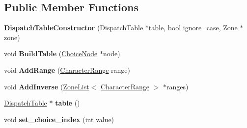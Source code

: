 \subsection*{Public Member Functions}
\begin{DoxyCompactItemize}
\item 
{\bfseries Dispatch\+Table\+Constructor} (\hyperlink{classv8_1_1internal_1_1_dispatch_table}{Dispatch\+Table} $\ast$table, bool ignore\+\_\+case, \hyperlink{classv8_1_1internal_1_1_zone}{Zone} $\ast$zone)\hypertarget{classv8_1_1internal_1_1_dispatch_table_constructor_a6b77a705962e90834c94f3bb955c13e0}{}\label{classv8_1_1internal_1_1_dispatch_table_constructor_a6b77a705962e90834c94f3bb955c13e0}

\item 
void {\bfseries Build\+Table} (\hyperlink{classv8_1_1internal_1_1_choice_node}{Choice\+Node} $\ast$node)\hypertarget{classv8_1_1internal_1_1_dispatch_table_constructor_a1b76a50e582a68e269cb890eedf6d589}{}\label{classv8_1_1internal_1_1_dispatch_table_constructor_a1b76a50e582a68e269cb890eedf6d589}

\item 
void {\bfseries Add\+Range} (\hyperlink{classv8_1_1internal_1_1_character_range}{Character\+Range} range)\hypertarget{classv8_1_1internal_1_1_dispatch_table_constructor_a1548155ab04ff6b6e9dd66604dedb40d}{}\label{classv8_1_1internal_1_1_dispatch_table_constructor_a1548155ab04ff6b6e9dd66604dedb40d}

\item 
void {\bfseries Add\+Inverse} (\hyperlink{classv8_1_1internal_1_1_zone_list}{Zone\+List}$<$ \hyperlink{classv8_1_1internal_1_1_character_range}{Character\+Range} $>$ $\ast$ranges)\hypertarget{classv8_1_1internal_1_1_dispatch_table_constructor_af12d73b2803161628f8a173f2c659b03}{}\label{classv8_1_1internal_1_1_dispatch_table_constructor_af12d73b2803161628f8a173f2c659b03}

\item 
\hyperlink{classv8_1_1internal_1_1_dispatch_table}{Dispatch\+Table} $\ast$ {\bfseries table} ()\hypertarget{classv8_1_1internal_1_1_dispatch_table_constructor_a77523bbe347cbbbead2638b05779bf8c}{}\label{classv8_1_1internal_1_1_dispatch_table_constructor_a77523bbe347cbbbead2638b05779bf8c}

\item 
void {\bfseries set\+\_\+choice\+\_\+index} (int value)\hypertarget{classv8_1_1internal_1_1_dispatch_table_constructor_af140ecca6eb06039a4a4b25f93a3379e}{}\label{classv8_1_1internal_1_1_dispatch_table_constructor_af140ecca6eb06039a4a4b25f93a3379e}

\end{DoxyCompactItemize}

